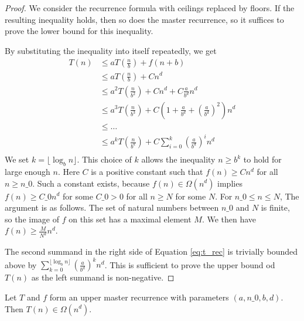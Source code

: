 \begin{proof}
    \leanok
    We consider the recurrence formula with ceilings replaced by floors. If the
    resulting inequality holds, then so does the master recurrence, so it 
    suffices to prove the lower bound for this inequality.

    By substituting the inequality into itself repeatedly, we get
    \begin{align}
        \label{eq:t_rec}
        T(n) &\leq a T(\frac{n}{b}) + f(n + b) \\
             &\leq a T(\frac{n}{b}) + C n^d \\
             &\leq a^2 T(\frac{n}{b^2}) + C n^d + C \frac{a}{b^d} n^d \\
             &\leq a^3 T(\frac{n}{b^3}) + C (1 + \frac{a}{b^d} + 
                                            (\frac{a}{b^d})^2) n^d \\
             &\leq \dots \\
             &\leq a^k T(\frac{n}{b^k}) + C \sum_{i=0}^k 
                                                    (\frac{a}{b^d})^i n^d \\
    \end{align}
    We set $k = \lfloor \log_b{n} \rfloor$. This choice of $k$ allows the 
    inequality $n \geq b^k$ to hold for large enough $n$. Here $C$ is a 
    positive constant such that $f(n) \geq C n^d$ for all $n \geq n\_0$. 
    Such a constant exists, because $f(n) \in \Omega(n^d)$ implies
    $f(n) \geq C\_0 n^d$ for some $C\_0 > 0$ for all $n \geq N$ for some $N$.
    For $n\_0 \leq n \leq N$, The argument is as follows. The set of natural 
    numbers between $n\_0$ and $N$ is finite, so the image of $f$ on this
    set has a maximal element $M$. We then have $f(n) \geq \frac{M}{N^d} n^d$.

    The second summand in the right side of Equation \ref{eq:t_rec} is
    trivially bounded above by 
    $\sum_{k=0}^{\lfloor \log_b{n} \rfloor} (\frac{a}{b^d})^k n^d$. This is 
    sufficient to prove the upper bound od $T(n)$ as the left summand is 
    non-negative.
\end{proof}

\begin{lemma}
    \label{lemma:upper_master_rec_big_omega}
    \leanok
    Let $T$ and $f$ form an upper master recurrence with parameters 
    $(a, n\_0, b, d)$. Then $T(n) \in \Omega(n^d)$.
\end{lemma}

